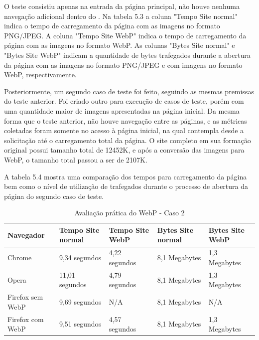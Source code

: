 \documentclass[espaco=simples,appendix=Name]{abnt}
\begin{document}
O teste consistiu apenas na entrada da página principal, não houve nenhuma navegação adicional dentro do . Na tabela 5.3 a coluna "Tempo Site normal" indica o tempo de carregamento da página com as imagens no formato PNG/JPEG. A coluna "Tempo Site WebP" indica o tempo de carregamento da página com as imagens no formato WebP. As colunas "Bytes Site normal" e "Bytes Site WebP" indicam a quantidade de bytes trafegados durante a abertura da página com as imagens no formato PNG/JPEG e com imagens no formato WebP, respectivamente.

Posteriormente, um segundo caso de teste foi feito, seguindo as mesmas premissas do teste anterior. Foi criado outro  para execução de casos de teste, porém com uma quantidade maior de imagens apresentadas na página inicial. Da mesma forma que o teste anterior, não houve navegação entre as páginas, e as métricas coletadas foram somente no acesso à página inicial, na qual contempla desde a solicitação até o carregamento total da página. O site completo em sua formação original possui tamanho total de 12452K, e após a conversão das imagens para WebP, o tamanho total passou a ser de 2107K. 

A tabela 5.4 mostra uma comparação dos tempos para carregamento da página bem como o nível de utilização de  trafegados durante o processo de abertura da página do segundo caso de teste.

\begin{table}[ht]
        \centering
        \caption{Avaliação prática do WebP - Caso 2
        \label{tbl:padc}}{
                \begin{tabular}{|l|p{3cm}|p{3cm}|l|p{2cm}|}
                \hline
                        \textbf{Navegador} & \textbf{Tempo Site normal} & \textbf{Tempo Site WebP} & \textbf{Bytes Site normal} & \textbf{Bytes Site WebP} \\
                        \hline
                        Chrome			&  9,34 segundos	& 4,22 segundos		& 8,1 Megabytes		& 1,3 Megabytes \\
                        \hline
						Opera			&  11,01 segundos	& 4,79 segundos		& 8,1 Megabytes		& 1,3 Megabytes \\
						\hline
                        Firefox sem WebP	&  9,69 segundos	& N/A			& 8,1 Megabytes		& N/A \\
                        \hline
                        Firefox com WebP	&  9,51 segundos	& 4,57 segundos		& 8,1 Megabytes		& 1,3 Megabytes \\
                        \hline
                \end{tabular}
                }
\end{table}
\end{document}
